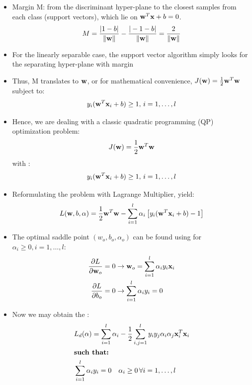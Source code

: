 \documentclass{tron}
\begin{document}
\begin{definition}{}
	\begin{itemize}
		\item Margin M:  from the discriminant hyper-plane to the closest samples from each class (support vectors), which lie on $\mathbf{w}^T \mathbf{x} + b = 0$.
			\begin{equation}
			M = \frac{|1-b|}{\|\mathbf{w}\|} - \frac{|-1-b|}{\|\mathbf{w}\|} = \frac{2}{\|\mathbf{w}\|}
			\end{equation}
		\item For the linearly separable case, the support vector algorithm simply looks for the separating hyper-plane with  margin
		\item Thus,  M translates to  $\mathbf{w}$, or for mathematical convenience, $J(\mathbf{w}) = \frac12 \mathbf{w}^T \mathbf{w}$ subject to: 
			\begin{equation}
				y_i (\mathbf{w}^T \mathbf{x}_i + b) \geq 1, \, i=1,\dots,l
			\end{equation}
		\item Hence, we are dealing with a classic quadratic programming (QP) optimization problem:
			\begin{equation}
				J(\mathbf{w}) = \frac12 \mathbf{w}^T \mathbf{w}
			\end{equation} 
			 with : 
			 \begin{equation}
			 	y_i(\mathbf{w}^T \mathbf{x}_i + b) \geq 1, \, i = 1, \dots, l
			 \end{equation}
		\item Reformulating the problem with Lagrange Multiplier, yield:
		\begin{equation}
			L(\mathbf{w}, b, \alpha) = \frac12 \mathbf{w}^T \mathbf{w} - \sum_{i=1}^l \alpha_i \left[ y_i (\mathbf{w}^T \mathbf{x}_i + b) - 1 \right]
		\end{equation}	
		\item The optimal saddle point $(w_o, b_o, \alpha_o)$ can be found using  for $\alpha_i \geq 0, i = 1, \dots , l$:
		\begin{align}
			\frac{\partial L}{\partial \mathbf{w}_o} = 0 & \rightarrow \mathbf{w}_o = \sum_{i=1}^l \alpha_i y_i \mathbf{x}_i \\
			\frac{\partial L}{\partial b_o} = 0  & \rightarrow \sum_{i=1}^l \alpha_i y_i = 0
		\end{align}
		\item Now we may obtain the :
		\begin{align}
			& L_d(\alpha) = \sum_{i=1}^l \alpha_i - \frac12 \sum_{i, j=1}^l y_i y_j \alpha_i \alpha_j \mathbf{x}_i^T \mathbf{x}_i \\
			& \textbf{such that:}\\
			& \sum_{i=1}^l \alpha_i y_i = 0 \quad \alpha_i \geq 0 \, \forall i = 1, \dots, l
		\end{align}
	\end{itemize}
	

\end{definition}
\end{document}
